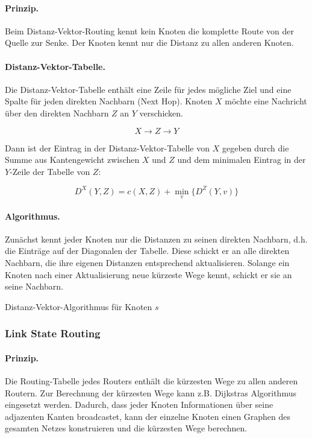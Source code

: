 \documentclass[]{scrartcl}
\begin{document}
\paragraph{Prinzip.}Beim Distanz-Vektor-Routing kennt kein Knoten die komplette Route von der Quelle zur Senke. Der Knoten kennt nur die Distanz zu allen anderen Knoten.

\paragraph{Distanz-Vektor-Tabelle.} Die Distanz-Vektor-Tabelle enth\"alt eine Zeile f\"ur jedes m\"ogliche Ziel und eine Spalte f\"ur jeden direkten Nachbarn (Next Hop). Knoten $X$ m\"ochte eine Nachricht \"uber den direkten Nachbarn $Z$ an $Y$ verschicken.

$$X \to Z \to Y$$

Dann ist der Eintrag in der Distanz-Vektor-Tabelle von $X$ gegeben durch die Summe aus Kantengewicht zwischen $X$ und $Z$ und dem minimalen Eintrag in der $Y$-Zeile der Tabelle von $Z$:

$$D^X (Y,Z) = c(X,Z) + \min_{v}\{ D^Z (Y,v)\}$$

\paragraph{Algorithmus.} Zun\"achst kennt jeder Knoten nur die Distanzen zu seinen direkten Nachbarn, d.h. die Eintr\"age auf der Diagonalen der Tabelle. Diese schickt er an alle direkten Nachbarn, die ihre eigenen Distanzen entsprechend aktualisieren. Solange ein Knoten nach einer Aktualisierung neue k\"urzeste Wege kennt, schickt er sie an seine Nachbarn.

\begin{algorithm}[htbp]
\caption{Distanz-Vektor-Algorithmus f\"ur Knoten $s$}

\end{algorithm}


\subsubsection{Link State Routing} 

\paragraph{Prinzip.} Die Routing-Tabelle jedes Routers enth\"alt die k\"urzesten Wege zu allen anderen Routern. Zur Berechnung der k\"urzesten Wege kann z.B. Dijkstras Algorithmus eingesetzt werden. Dadurch, dass jeder Knoten Informationen \"uber seine adjazenten Kanten broadcastet, kann der einzelne Knoten einen Graphen des gesamten Netzes konstruieren und die k\"urzesten Wege berechnen.
\end{document}
